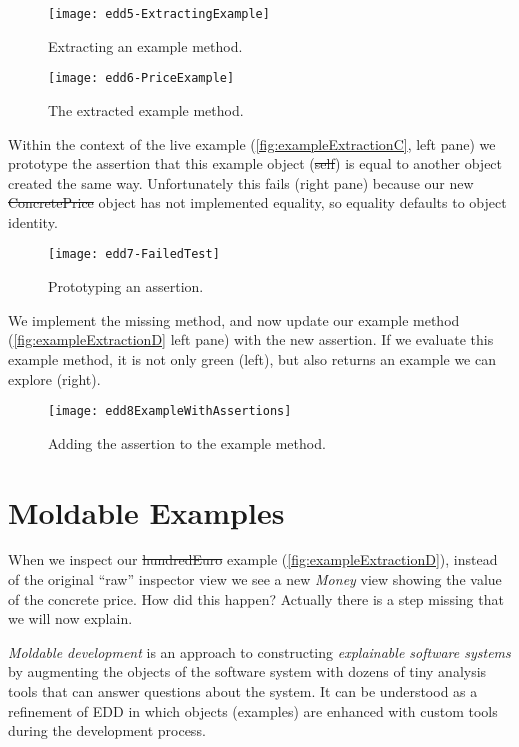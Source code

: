 \documentclass[sigplan,anonymous,review,10pt]{acmart}
\begin{document}
\begin{figure}[h]
  \texttt{[image: edd5-ExtractingExample]}
	\caption{Extracting an example method.}
  \label{fig:exampleExtractionA}
\end{figure}


\begin{figure}[h]
  \texttt{[image: edd6-PriceExample]}
	\caption{The extracted example method.}
  \label{fig:exampleExtractionB}
\end{figure}


Within the context of the live example (\autoref{fig:exampleExtractionC}, left pane) we prototype the assertion that this example object (\ie \st{self}) is equal to another object created the same way.
Unfortunately this fails (right pane) because our new \st{ConcretePrice} object has not implemented equality, so equality defaults to object identity.
\begin{figure}[h]
  \texttt{[image: edd7-FailedTest]}
	\caption{Prototyping an assertion.}
  \label{fig:exampleExtractionC}
\end{figure}

We implement the missing method, and now update our example method (\autoref{fig:exampleExtractionD} left pane) with the new assertion.
If we evaluate this example method, it is not only green (left), but also returns an example we can explore (right).

\begin{figure}[h]
  \texttt{[image: edd8ExampleWithAssertions]}
	\caption{Adding the assertion to the example method.}
  \label{fig:exampleExtractionD}
\end{figure}


\section{Moldable Examples}\label{sec:moldable}

When we inspect our \st{hundredEuro} example (\autoref{fig:exampleExtractionD}), instead of the original ``raw'' inspector view we see a new \emph{Money} view showing the value of the concrete price.
How did this happen?
Actually there is a step missing that we will now explain.

\emph{Moldable development} is an approach to constructing \emph{explainable software systems} by augmenting the objects of the software system with dozens of tiny analysis tools that can answer questions about the system.
It can be understood as a refinement of EDD in which objects (examples) are enhanced with custom tools during the development process.
\end{document}
